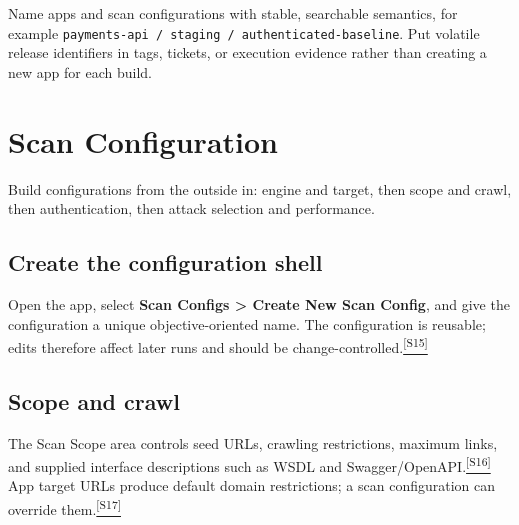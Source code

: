 \documentclass[11pt,letterpaper,oneside]{scrreprt}
\newcommand{\src}[1]{\hyperref[src:#1]{\textsuperscript{\color{R7Orange}[#1]}}}
\newcommand{\uipath}[1]{\textsf{\textbf{#1}}}
\newcommand{\code}[1]{\texttt{#1}}
\newcommand{\chapterlead}[1]{\begin{tcolorbox}[enhanced,colback=R7Light,colframe=R7Light,boxrule=0pt,borderline west={3pt}{0pt}{R7Orange},arc=0pt,left=9pt,right=9pt,top=7pt,bottom=7pt]#1\end{tcolorbox}}
\begin{document}
\begin{oprec}
Name apps and scan configurations with stable, searchable semantics, for example \code{payments-api / staging / authenticated-baseline}. Put volatile release identifiers in tags, tickets, or execution evidence rather than creating a new app for each build.
\end{oprec}

\chapter{Scan Configuration}
\chapterlead{Build configurations from the outside in: engine and target, then scope and crawl, then authentication, then attack selection and performance.}

\section{Create the configuration shell}
Open the app, select \uipath{Scan Configs > Create New Scan Config}, and give the configuration a unique objective-oriented name. The configuration is reusable; edits therefore affect later runs and should be change-controlled.\src{S15}

\section{Scope and crawl}
The Scan Scope area controls seed URLs, crawling restrictions, maximum links, and supplied interface descriptions such as WSDL and Swagger/OpenAPI.\src{S16} App target URLs produce default domain restrictions; a scan configuration can override them.\src{S17}
\end{document}
